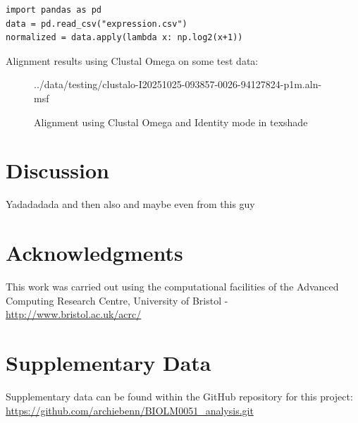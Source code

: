 \documentclass[12pt]{article}
\begin{document}
\begin{verbatim}
import pandas as pd
data = pd.read_csv("expression.csv")
normalized = data.apply(lambda x: np.log2(x+1))
\end{verbatim}

Alignment results using Clustal Omega on some test data: 
\begin{figure}[htbp]
\begin{texshade}{../data/testing/clustalo-I20251025-093857-0026-94127824-p1m.aln-msf}
\showlegend
\end{texshade}
\caption{Alignment using Clustal Omega and Identity mode in texshade}
\label{fig:workflow}
\end{figure}



\section*{Discussion}
Yadadadada \citep{kent2002blat} and then also \citep{wolin1997microbe} and maybe even from this guy \cite{baker1997signaling,wolin1997microbe}









\section*{Acknowledgments}
This work was carried out using the computational facilities of the Advanced Computing Research Centre, University of Bristol - \url{http://www.bristol.ac.uk/acrc/}




\section*{Supplementary Data}
Supplementary data can be found within the GitHub repository for this project: \url{https://github.com/archiebenn/BIOLM0051_analysis.git}
\end{document}
